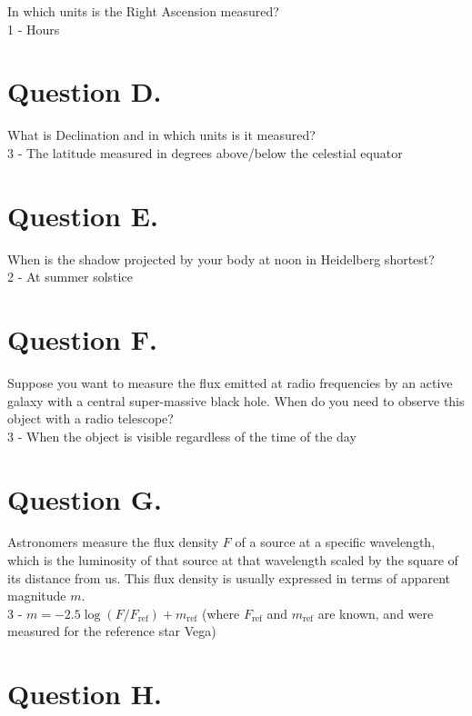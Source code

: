 \documentclass[11pt,a4paper,twoside]{article}
\begin{document}
In which units is the Right Ascension measured? \\

1 - Hours

\section*{Question D.}

What is Declination and in which units is it measured? \\

3 - The latitude measured in degrees above/below the celestial equator

\section*{Question E.}

When is the shadow projected by your body at noon in Heidelberg shortest? \\

2 - At summer solstice

\section*{Question F.}

Suppose you want to measure the flux emitted at radio frequencies by an active galaxy with a central super-massive black hole. When do you need to observe this object with a radio telescope? \\

3 - When the object is visible regardless of the time of the day

\section*{Question G.}

Astronomers measure the flux density $F$ of a source at a specific wavelength, which is the luminosity of that source at that wavelength scaled by the square of its distance from us. This flux density is usually expressed in terms of apparent magnitude $m$. \\

3 - $m = -2.5\log{\left( F/F_{\text{ref}} \right) } + m_{\text{ref}}$ (where $F_{\text{ref}}$ and $m_{\text{ref}}$ are known, and were measured for the reference star Vega)

\section*{Question H.}
\end{document}
